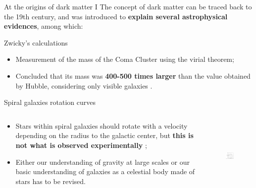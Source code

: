 \documentclass[8pt]{beamer}
\begin{document}
\begin{frame}{At the origins of dark matter I}
\justifying
The concept of dark matter can be traced back to the 19th century, and was introduced to \textbf{explain several astrophysical evidences}, among which: \vfill

\vspace{10pt}	
\begin{block}{ \centering Zwicky's calculations}\end{block}

\begin{itemize}
\justifying
\item Measurement of the mass of the Coma Cluster using the virial theorem;
\item Concluded that its mass was \textbf{400-500 times larger} than the value obtained by Hubble, considering only visible galaxies \cite{Zwicky}.
\end{itemize} \vfill

\vspace{10pt}	
\begin{block}{ \centering Spiral galaxies rotation curves}\end{block}

\begin{columns}
	\begin{column}{0.65\textwidth}
\begin{itemize}
\justifying
\vspace{-5pt}	
\item Stars within spiral galaxies should rotate with a velocity depending on the radius to the galactic center, but \textbf{this is not what is observed experimentally} \cite{RotationCurves};
\vspace{1pt}	
\item Either our understanding of gravity at large scales or our basic understanding of galaxies as a celestial body made of stars has to be revised.
\end{itemize} 
\end{column}

\begin{column}{0.44\textwidth}
\begin{figure}[htbp]
\begin{center}
\includegraphics[width=4.5cm, height=3.7cm]{figs/RotationCurve.jpeg}
\end{center}
\end{figure}
\end{column}
\end{columns} \vfill

\end{frame}
\end{document}
